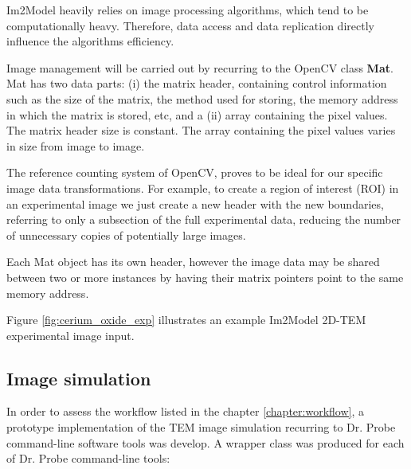 \documentclass[
  oneside,
  11pt, a4paper,
  footinclude=true,
  headinclude=true,
  cleardoublepage=empty
]{scrbook}
\begin{document}
	
	Im2Model heavily relies on image processing algorithms, which tend to be computationally heavy. Therefore, data access and data replication directly influence the algorithms efficiency.\par 
	
	Image management will be carried out by recurring to the OpenCV class \textbf{Mat}.  Mat has two data parts: (i) the matrix header, containing control information such as the size of the matrix, the method used for storing, the memory address in which the matrix is stored, etc, and a (ii) array containing the pixel values. 
	The matrix header size is constant. The array containing the pixel values varies in size from image to image.\par 
 The reference counting system of OpenCV, proves to be ideal for our specific image data transformations. For example, to create a region of interest (ROI) in an experimental image we just create a new header with the new boundaries, referring to only a subsection of the full experimental data, reducing the number of unnecessary copies of potentially large images.\par 
 Each Mat object has its own header, however the image data may be shared between two or more instances by having their matrix pointers point to the same memory address.
 
	
	Figure \ref{fig:cerium_oxide_exp} illustrates an example Im2Model 2D-TEM experimental image input.  
	
		
	
	\subsection{Image simulation}
	
	In order to assess the workflow listed in the chapter \ref{chapter:workflow}, a prototype implementation of the TEM image simulation recurring to Dr. Probe command-line software tools \citep{drprobe} was develop. A wrapper class was produced for each of Dr. Probe command-line tools:
	
\end{document}

